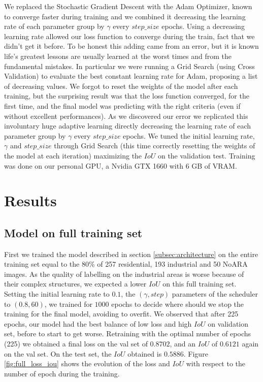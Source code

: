 \documentclass[9pt,conference,compsocconf]{IEEEtran}
\begin{document}
We replaced the Stochastic Gradient Descent with the Adam Optimizer, known to converge faster during training \cite{kingma2014adam} and we combined it decreasing the learning rate of each parameter group by $\gamma$ every $step\_size$ epochs. Using a decreasing learning rate allowed our loss function to converge during the train, fact that we didn't get it before. To be honest this adding came from an error, but it is known life's greatest lessons are usually learned at the worst times and from the fundamental mistakes.
In particular we were running a Grid Search (using Cross Validation) to evaluate the best constant learning rate for Adam, proposing a list of decreasing values. We forgot to reset the weights of the model after each training, but the surprising result was that the loss function converged, for the first time, and the final model was predicting with the right criteria (even if without excellent performances). As we discovered our error we replicated this involuntary huge adaptive learning  directly decreasing the learning rate of each parameter group by $\gamma$ every $step\_size$ epochs.
We tuned the initial learning rate, $\gamma$ and $step\_size$ through Grid Search (this time correctly resetting the weights of the model at each iteration) maximizing the $IoU$ on the validation test. Training was done on our personal GPU, a Nvidia GTX 1660 with 6 GB of VRAM.




\section{Results}
\label{sec:results}
\subsection{Model on full training set}
\label{subsec:full}
First we trained the model described in section \ref{subsec:architecture} on the entire training set equal to the 80\% of 257 residential, 193 industrial and 50 NoARA images. As the quality of labelling on the industrial areas is worse because of their complex structures, we expected a lower $IoU$ on this full training set. Setting the initial learning rate to $0.1$, the $(\gamma,step)$ parameters of the scheduler to $(0.8,60)$, we trained for $1000$ epochs to decide where should we stop the training for the final model, avoiding to overfit. We observed that after 225 epochs, our model had the best balance of low loss and high $IoU$ on validation set, before to start to get worse. Retraining with the optimal number of epochs (225) we obtained a final loss on the val set of $0.8702$, and an $IoU$ of $0.6121$ again on the val set. On the test set, the $IoU$ obtained is $0.5886$. Figure \ref{fig:full_loss_iou} shows the evolution of the loss and $IoU$ with respect to the number of epoch during the training.
\end{document}
